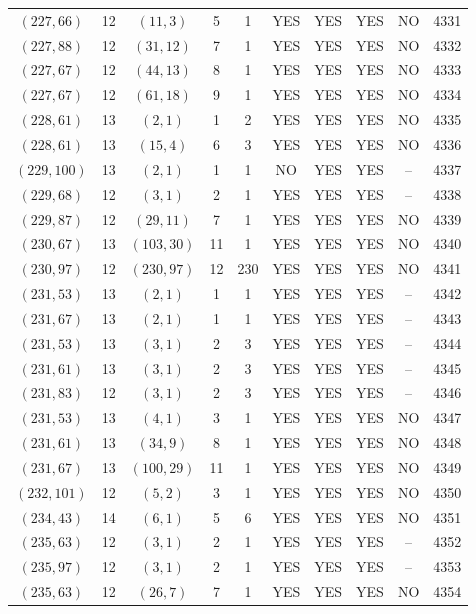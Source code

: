 \begin{longtable}{|c|c|c|c|c|c|c|c|c|c|}
$(227, 66)$ & 12 & $(11, 3)$ & 5 & 1 & YES & YES & YES & NO & 4331\\
$(227, 88)$ & 12 & $(31, 12)$ & 7 & 1 & YES & YES & YES & NO & 4332\\
$(227, 67)$ & 12 & $(44, 13)$ & 8 & 1 & YES & YES & YES & NO & 4333\\
$(227, 67)$ & 12 & $(61, 18)$ & 9 & 1 & YES & YES & YES & NO & 4334\\
$(228, 61)$ & 13 & $(2, 1)$ & 1 & 2 & YES & YES & YES & NO & 4335\\
$(228, 61)$ & 13 & $(15, 4)$ & 6 & 3 & YES & YES & YES & NO & 4336\\
$(229, 100)$ & 13 & $(2, 1)$ & 1 & 1 & NO & YES & YES & -- & 4337\\
$(229, 68)$ & 12 & $(3, 1)$ & 2 & 1 & YES & YES & YES & -- & 4338\\
$(229, 87)$ & 12 & $(29, 11)$ & 7 & 1 & YES & YES & YES & NO & 4339\\
$(230, 67)$ & 13 & $(103, 30)$ & 11 & 1 & YES & YES & YES & NO & 4340\\
$(230, 97)$ & 12 & $(230, 97)$ & 12 & 230 & YES & YES & YES & NO & 4341\\
$(231, 53)$ & 13 & $(2, 1)$ & 1 & 1 & YES & YES & YES & -- & 4342\\
$(231, 67)$ & 13 & $(2, 1)$ & 1 & 1 & YES & YES & YES & -- & 4343\\
$(231, 53)$ & 13 & $(3, 1)$ & 2 & 3 & YES & YES & YES & -- & 4344\\
$(231, 61)$ & 13 & $(3, 1)$ & 2 & 3 & YES & YES & YES & -- & 4345\\
$(231, 83)$ & 12 & $(3, 1)$ & 2 & 3 & YES & YES & YES & -- & 4346\\
$(231, 53)$ & 13 & $(4, 1)$ & 3 & 1 & YES & YES & YES & NO & 4347\\
$(231, 61)$ & 13 & $(34, 9)$ & 8 & 1 & YES & YES & YES & NO & 4348\\
$(231, 67)$ & 13 & $(100, 29)$ & 11 & 1 & YES & YES & YES & NO & 4349\\
$(232, 101)$ & 12 & $(5, 2)$ & 3 & 1 & YES & YES & YES & NO & 4350\\
$(234, 43)$ & 14 & $(6, 1)$ & 5 & 6 & YES & YES & YES & NO & 4351\\
$(235, 63)$ & 12 & $(3, 1)$ & 2 & 1 & YES & YES & YES & -- & 4352\\
$(235, 97)$ & 12 & $(3, 1)$ & 2 & 1 & YES & YES & YES & -- & 4353\\
$(235, 63)$ & 12 & $(26, 7)$ & 7 & 1 & YES & YES & YES & NO & 4354\\

\end{longtable}

